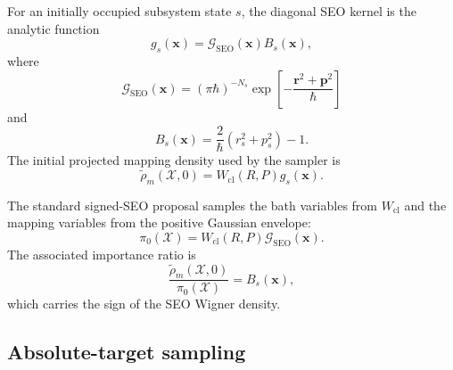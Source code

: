 \documentclass[
  11pt,
  letterpaper,
  onehalfspacing,
  normalmargins,
  equalmargins,
  oneside
]{ut-thesis}
\begin{document}
For an initially occupied subsystem state \(s\), the diagonal SEO kernel is
the analytic function
\begin{equation}
g_s(\mathbf x)
=
\mathcal G_{\mathrm{SEO}}(\mathbf x)
B_s(\mathbf x),
\label{appeq:seo-factorization}
\end{equation}
where
\begin{equation}
\mathcal G_{\mathrm{SEO}}(\mathbf x)
=
(\pi\hbar)^{-N_s}
\exp\left[
-\frac{\mathbf r^2+\mathbf p^2}{\hbar}
\right]
\label{appeq:seo-gaussian-envelope}
\end{equation}
and
\begin{equation}
B_s(\mathbf x)
=
\frac{2}{\hbar}
\left(
r_s^2+p_s^2
\right)
-1.
\label{appeq:seo-polynomial}
\end{equation}
The initial projected mapping density used by the sampler is
\begin{equation}
\tilde\rho_m(\boldsymbol{\mathcal X},0)
=
W_{\mathrm{cl}}(R,P)
g_s(\mathbf x).
\label{appeq:initial-projected-density}
\end{equation}

The standard signed-SEO proposal samples the bath variables from
\(W_{\mathrm{cl}}\) and the mapping variables from the positive Gaussian
envelope:
\begin{equation}
\pi_0(\boldsymbol{\mathcal X})
=
W_{\mathrm{cl}}(R,P)
\mathcal G_{\mathrm{SEO}}(\mathbf x).
\label{appeq:signed-seo-proposal}
\end{equation}
The associated importance ratio is
\begin{equation}
\frac{\tilde\rho_m(\boldsymbol{\mathcal X},0)}{\pi_0(\boldsymbol{\mathcal X})}
=
B_s(\mathbf x),
\label{appeq:signed-seo-weight}
\end{equation}
which carries the sign of the SEO Wigner density.

\subsection{Absolute-target sampling}
\label{appsubsec:absolute-target-sampling}
\end{document}
